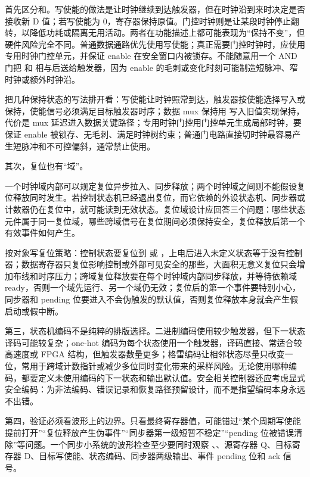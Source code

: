 首先区分和。写使能的做法是让时钟继续到达触发器，但在时钟沿到来时决定是否接收新 D 值；若写使能为 0，寄存器保持原值。门控时钟则是让某段时钟停止翻转，以降低功耗或隔离无用活动。两者在功能描述上都可能表现为“保持不变”，但硬件风险完全不同。普通数据通路优先使用写使能；真正需要门控时钟时，应使用专用时钟门控单元，并保证 enable 在安全窗口内被锁存。不能随意用一个 AND 门把  和  相与后送给触发器，因为 enable 的毛刺或变化时刻可能制造短脉冲、窄时钟或额外时钟沿。

把几种保持状态的写法排开看：写使能让时钟照常到达，触发器按使能选择写入或保持，使能信号必须满足目标触发器时序；数据 mux 保持用  写入旧值实现保持，代价是 mux 延迟进入数据关键路径；专用时钟门控用门控单元生成局部时钟，要保证 enable 被锁存、无毛刺、满足时钟树约束；普通门电路直接切时钟最容易产生短脉冲和不可控偏斜，通常禁止使用。

其次，复位也有“域”。

一个时钟域内部可以规定复位异步拉入、同步释放；两个时钟域之间则不能假设复位释放同时发生。若控制状态机已经退出复位，而它依赖的外设状态机、同步器或计数器仍在复位中，就可能读到无效状态。复位域设计应回答三个问题：哪些状态元件属于同一复位域，哪些跨域信号在复位期间必须保持安全，复位释放后第一个有效事件如何产生。

按对象写复位策略：控制状态要复位到  或 ，上电后进入未定义状态等于没有控制器；数据寄存器只复位影响控制或外部可见安全的那些，大面积无意义复位只会增加布线和时序压力；跨域复位释放要在每个时钟域内部同步释放，并等待依赖域 ready，否则一个域先运行、另一个域仍无效；复位后的第一个事件要特别小心，同步器和 pending 位要进入不会伪触发的默认值，否则复位释放本身就会产生假启动或假中断。

第三，状态机编码不是纯粹的排版选择。二进制编码使用较少触发器，但下一状态译码可能较复杂；one-hot 编码为每个状态使用一个触发器，译码直接、常适合较高速度或 FPGA 结构，但触发器数量更多；格雷编码让相邻状态尽量只改变一位，常用于跨域计数指针或减少多位同时变化带来的采样风险。无论使用哪种编码，都要定义未使用编码的下一状态和输出默认值。安全相关控制器还应考虑显式安全编码：为非法编码、错误记录和恢复路径预留设计，而不是指望编码本身永远不出错。

第四，验证必须看波形上的边界。只看最终寄存器值，可能错过“某个周期写使能提前打开”“复位释放产生伪事件”“同步器第一级短暂不稳定”“pending 位被错误清除”等问题。一个同步小系统的波形检查至少要同时观察 、、源寄存器 Q、目标寄存器 D、目标写使能、状态编码、同步器两级输出、事件 pending 位和 ack 信号。

